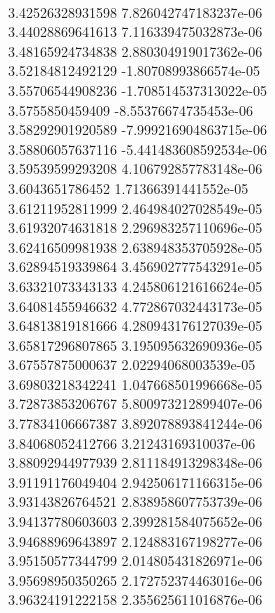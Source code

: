 { \\
3.42526328931598 7.826042747183237e-06
 \\
3.44028869641613 7.116339475032873e-06
 \\
3.48165924734838 2.880304919017362e-06
 \\
3.52184812492129 -1.80708993866574e-05
 \\
3.55706544908236 -1.708514537313022e-05
 \\
3.5755850459409 -8.55376674735453e-06
 \\
3.58292901920589 -7.999216904863715e-06
 \\
3.58806057637116 -5.441483608592534e-06
 \\
3.59539599293208 4.106792857783148e-06
 \\
3.6043651786452 1.71366391441552e-05
 \\
3.61211952811999 2.464984027028549e-05
 \\
3.61932074631818 2.296983257110696e-05
 \\
3.62416509981938 2.638948353705928e-05
 \\
3.62894519339864 3.456902777543291e-05
 \\
3.63321073343133 4.245806121616624e-05
 \\
3.64081455946632 4.772867032443173e-05
 \\
3.64813819181666 4.280943176127039e-05
 \\
3.65817296807865 3.195095632690936e-05
 \\
3.67557875000637 2.02294068003539e-05
 \\
3.69803218342241 1.047668501996668e-05
 \\
3.72873853206767 5.800973212899407e-06
 \\
3.77834106667387 3.892078893841244e-06
 \\
3.84068052412766 3.21243169310037e-06
 \\
3.88092944977939 2.811184913298348e-06
 \\
3.91191176049404 2.942506171166315e-06
 \\
3.93143826764521 2.838958607753739e-06
 \\
3.94137780603603 2.399281584075652e-06
 \\
3.94688969643897 2.124883167198277e-06
 \\
3.95150577344799 2.014805431826971e-06
 \\
3.95698950350265 2.172752374463016e-06
 \\
3.96324191222158 2.355625611016876e-06
 \\
}
